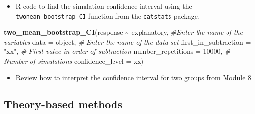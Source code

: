 \documentclass[
]{report}
\newenvironment{Shaded}{\begin{snugshade}}{\end{snugshade}}
\newcommand{\AttributeTok}[1]{\textcolor[rgb]{0.13,0.29,0.53}{#1}}
\newcommand{\CommentTok}[1]{\textcolor[rgb]{0.56,0.35,0.01}{\textit{#1}}}
\newcommand{\DecValTok}[1]{\textcolor[rgb]{0.00,0.00,0.81}{#1}}
\newcommand{\FunctionTok}[1]{\textcolor[rgb]{0.13,0.29,0.53}{\textbf{#1}}}
\newcommand{\NormalTok}[1]{#1}
\newcommand{\SpecialCharTok}[1]{\textcolor[rgb]{0.81,0.36,0.00}{\textbf{#1}}}
\newcommand{\StringTok}[1]{\textcolor[rgb]{0.31,0.60,0.02}{#1}}
\providecommand{\tightlist}{%
  \setlength{\itemsep}{0pt}\setlength{\parskip}{0pt}}
\begin{document}
\begin{itemize}
\tightlist
\item
  R code to find the simulation confidence interval using the \texttt{twomean\_bootstrap\_CI} function from the \texttt{catstats} package.
\end{itemize}

\begin{Shaded}
\begin{Highlighting}[]
\FunctionTok{two\_mean\_bootstrap\_CI}\NormalTok{(response }\SpecialCharTok{\textasciitilde{}}\NormalTok{ explanatory, }\CommentTok{\#Enter the name of the variables}
                      \AttributeTok{data =}\NormalTok{ object,  }\CommentTok{\# Enter the name of the data set}
                      \AttributeTok{first\_in\_subtraction =} \StringTok{"xx"}\NormalTok{, }\CommentTok{\# First value in order of subtraction}
                      \AttributeTok{number\_repetitions =} \DecValTok{10000}\NormalTok{,  }\CommentTok{\# Number of simulations}
                      \AttributeTok{confidence\_level =}\NormalTok{ xx)}
\end{Highlighting}
\end{Shaded}

\begin{itemize}
\tightlist
\item
  Review how to interpret the confidence interval for two groups from Module 8
\end{itemize}

\subsection*{Theory-based methods}\label{theory-based-methods-1}
\end{document}
